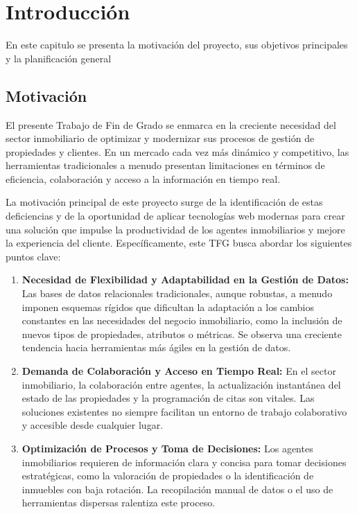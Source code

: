 
\chapter{Introducción}
\label{sec:intro}


En este capitulo se presenta la motivación del proyecto, sus objetivos principales y la planificación general


\section{Motivación}


El presente Trabajo de Fin de Grado se enmarca en la creciente necesidad del sector inmobiliario de optimizar y modernizar sus procesos de gestión de propiedades y clientes. En un mercado cada vez más dinámico y competitivo, las herramientas tradicionales a menudo presentan limitaciones en términos de eficiencia, colaboración y acceso a la información en tiempo real.

La motivación principal de este proyecto surge de la identificación de estas deficiencias y de la oportunidad de aplicar tecnologías web modernas para crear una solución que impulse la productividad de los agentes inmobiliarios y mejore la experiencia del cliente. Específicamente, este TFG busca abordar los siguientes puntos clave:

\begin{enumerate}
    \item \textbf{Necesidad de Flexibilidad y Adaptabilidad en la Gestión de Datos:} Las bases de datos relacionales tradicionales, aunque robustas, a menudo imponen esquemas rígidos que dificultan la adaptación a los cambios constantes en las necesidades del negocio inmobiliario, como la inclusión de nuevos tipos de propiedades, atributos o métricas. Se observa una creciente tendencia hacia herramientas más ágiles en la gestión de datos.
    \item \textbf{Demanda de Colaboración y Acceso en Tiempo Real:} En el sector inmobiliario, la colaboración entre agentes, la actualización instantánea del estado de las propiedades y la programación de citas son vitales. Las soluciones existentes no siempre facilitan un entorno de trabajo colaborativo y accesible desde cualquier lugar.
    \item \textbf{Optimización de Procesos y Toma de Decisiones:} Los agentes inmobiliarios requieren de información clara y concisa para tomar decisiones estratégicas, como la valoración de propiedades o la identificación de inmuebles con baja rotación. La recopilación manual de datos o el uso de herramientas dispersas ralentiza este proceso.
\end{enumerate}

